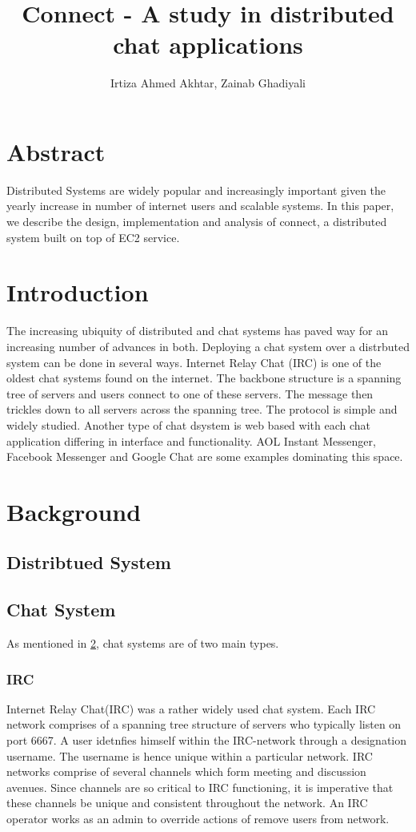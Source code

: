 \documentclass{article}
\begin{document}
\title{Connect - A study in distributed chat applications}
\author{Irtiza Ahmed Akhtar, Zainab Ghadiyali}

\maketitle

\section{Abstract}
Distributed Systems are widely popular and increasingly important given the yearly increase in number of internet users and scalable systems. In this paper, we describe the design, implementation and analysis of connect, a distributed system built on top of EC2 service. 
\section{Introduction}
\label{Introduction}
The increasing ubiquity of distributed and chat systems has paved way for an increasing number of advances in both. Deploying a chat system over a distrbuted system can be done in several ways. Internet Relay Chat (IRC) is one of the oldest chat systems found on the internet. The backbone structure is a spanning tree of servers and users connect to one of these servers. The message then trickles down to all servers across the spanning tree. The protocol is simple and widely studied. Another type of chat dsystem is web based with each chat application differing in interface and functionality. AOL Instant Messenger, Facebook Messenger and Google Chat are some examples dominating this space.
 
\section{Background}
\label{Background}
\subsection{Distribtued System}
\subsection{Chat System}
As mentioned in \ref{Introduction}, chat systems are of two main types. 
\subsubsection{IRC}
Internet Relay Chat(IRC\cite{IRC}) was a rather widely used chat system. Each IRC network comprises of a spanning tree structure of servers who typically listen on port 6667. A user idetnfies himself within the IRC-network through a designation username. The username is hence unique within a particular network. 
IRC networks comprise of several channels which form meeting and discussion avenues. Since channels are so critical to IRC functioning, it is imperative that these channels be unique and consistent throughout the network. An IRC operator works as an admin to override actions of remove users from network. 
\end{document}
